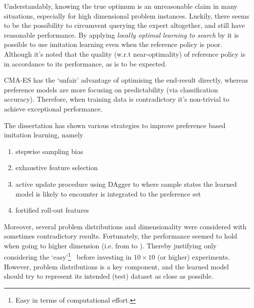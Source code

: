 Understandably, knowing the true optimum is an unreasonable claim in many 
situations, especially for high dimensional problem instances. 
Luckily, there seems to be the possibility to circumvent querying the expert 
altogether, and still have reasonable performance. 
By applying \emph{locally optimal learning to search} by \citet{ChangKADL15} it 
is possible to use imitation learning even when the reference policy is poor. 
Although it's noted that the quality (w.r.t near-optimality) of reference 
policy is in accordance to its performance, as is to be expected. 



CMA-ES has the `unfair' advantage of optimising the end-result directly, 
whereas preference models are more focusing on predictability (via 
classification accuracy). Therefore, when training data is contradictory it's 
non-trivial to achieve exceptional performance. 

The dissertation has shown various strategies to improve preference based 
imitation learning, namely
\begin{enumerate}
    \item stepwise sampling bias
    \item exhaustive feature selection
    \item active update procedure using DAgger to where sample states the 
    learned model is likely to encounter is integrated to the preference set
    \item fortified roll-out features
\end{enumerate}
Moreover, several problem distributions and dimensionality were considered with 
sometimes contradictory results. Fortunately, the performance seemed to hold 
when going to higher dimension (i.e. from \Problem[6\times5]{} to 
\Problem[10\times10]{}). Thereby justifying only considering the 
`easy'\footnote{Easy in terms of computational effort.} \JSP\ before investing 
in $10\times10$ (or higher) experiments. 
However, problem distributions is a key component, and the learned model should 
try to represent its intended (test) dataset as close as possible.



